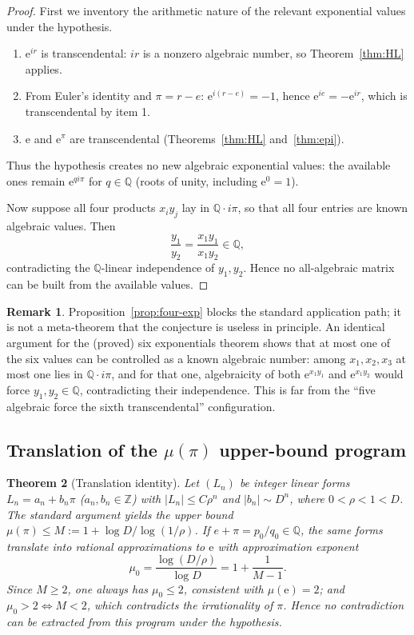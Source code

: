\documentclass[11pt]{amsart}
\newtheorem{theorem}{Theorem}[section]
\theoremstyle{definition}
\newtheorem{remark}[theorem]{Remark}
\theoremstyle{remark}
\numberwithin{equation}{section}
\newcommand{\Q}{\mathbb{Q}}
\newcommand{\Z}{\mathbb{Z}}
\newcommand{\irr}{\mu}
\newcommand{\ee}{\mathrm{e}}
\begin{document}
\begin{proof}
First we inventory the arithmetic nature of the relevant exponential values under the hypothesis.
\begin{enumerate}
\item $\ee^{ir}$ is transcendental: $ir$ is a nonzero algebraic number, so Theorem~\ref{thm:HL} applies.
\item From Euler's identity and $\pi=r-e$: $\ee^{i(r-e)}=-1$, hence $\ee^{ie}=-\ee^{ir}$, which is transcendental by item 1.
\item $\ee$ and $\ee^\pi$ are transcendental (Theorems~\ref{thm:HL} and~\ref{thm:epi}).
\end{enumerate}
Thus the hypothesis creates no new algebraic exponential values: the available ones remain $\ee^{qi\pi}$ for $q\in\Q$ (roots of unity, including $\ee^0=1$).

Now suppose all four products $x_iy_j$ lay in $\Q\cdot i\pi$, so that all four entries are known algebraic values. Then
\[
\frac{y_1}{y_2}=\frac{x_1y_1}{x_1y_2}\in\Q,
\]
contradicting the $\Q$-linear independence of $y_1,y_2$. Hence no all-algebraic matrix can be built from the available values.
\end{proof}

\begin{remark}
Proposition~\ref{prop:four-exp} blocks the standard application path; it is not a meta-theorem that the conjecture is useless in principle. An identical argument for the (proved) six exponentials theorem shows that at most one of the six values can be controlled as a known algebraic number: among $x_1,x_2,x_3$ at most one lies in $\Q\cdot i\pi$, and for that one, algebraicity of both $\ee^{x_1y_1}$ and $\ee^{x_1y_2}$ would force $y_1,y_2\in\Q$, contradicting their independence. This is far from the ``five algebraic force the sixth transcendental'' configuration.
\end{remark}

\subsection{Translation of the \texorpdfstring{$\irr(\pi)$}{mu(pi)} upper-bound program}

\begin{theorem}[Translation identity]\label{thm:translation}
Let $(L_n)$ be integer linear forms $L_n=a_n+b_n\pi$ ($a_n,b_n\in\Z$) with $|L_n|\le C\rho^n$ and $|b_n|\sim D^n$, where $0<\rho<1<D$. The standard argument yields the upper bound $\irr(\pi)\le M:=1+\log D/\log(1/\rho)$. If $e+\pi=p_0/q_0\in\Q$, the same forms translate into rational approximations to $\ee$ with approximation exponent
\[
\irr_0=\frac{\log(D/\rho)}{\log D}=1+\frac{1}{M-1}.
\]
Since $M\ge2$, one always has $\irr_0\le2$, consistent with $\irr(\ee)=2$; and $\irr_0>2\iff M<2$, which contradicts the irrationality of $\pi$. Hence no contradiction can be extracted from this program under the hypothesis.
\end{theorem}
\end{document}
